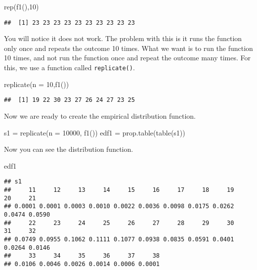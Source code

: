\documentclass[
]{article}
\newenvironment{Shaded}{\begin{snugshade}}{\end{snugshade}}
\newcommand{\AttributeTok}[1]{\textcolor[rgb]{0.77,0.63,0.00}{#1}}
\newcommand{\DecValTok}[1]{\textcolor[rgb]{0.00,0.00,0.81}{#1}}
\newcommand{\FunctionTok}[1]{\textcolor[rgb]{0.00,0.00,0.00}{#1}}
\newcommand{\NormalTok}[1]{#1}
\newcommand{\OtherTok}[1]{\textcolor[rgb]{0.56,0.35,0.01}{#1}}
\begin{document}
\begin{Shaded}
\begin{Highlighting}[]
\FunctionTok{rep}\NormalTok{(}\FunctionTok{f1}\NormalTok{(),}\DecValTok{10}\NormalTok{)}
\end{Highlighting}
\end{Shaded}

\begin{verbatim}
##  [1] 23 23 23 23 23 23 23 23 23 23
\end{verbatim}

You will notice it does not work. The problem with this is it runs the
function only once and repeats the outcome 10 times. What we want is to
run the function 10 times, and not run the function once and repeat the
outcome many times. For this, we use a function called
\texttt{replicate()}.

\begin{Shaded}
\begin{Highlighting}[]
\FunctionTok{replicate}\NormalTok{(}\AttributeTok{n =} \DecValTok{10}\NormalTok{,}\FunctionTok{f1}\NormalTok{())}
\end{Highlighting}
\end{Shaded}

\begin{verbatim}
##  [1] 19 22 30 23 27 26 24 27 23 25
\end{verbatim}

Now we are ready to create the empirical distribution function.

\begin{Shaded}
\begin{Highlighting}[]
\NormalTok{s1 }\OtherTok{=} \FunctionTok{replicate}\NormalTok{(}\AttributeTok{n =} \DecValTok{10000}\NormalTok{, }\FunctionTok{f1}\NormalTok{())}
\NormalTok{edf1 }\OtherTok{=} \FunctionTok{prop.table}\NormalTok{(}\FunctionTok{table}\NormalTok{(s1))}
\end{Highlighting}
\end{Shaded}

Now you can see the distribution function.

\begin{Shaded}
\begin{Highlighting}[]
\NormalTok{edf1}
\end{Highlighting}
\end{Shaded}

\begin{verbatim}
## s1
##     11     12     13     14     15     16     17     18     19     20     21 
## 0.0001 0.0001 0.0003 0.0010 0.0022 0.0036 0.0098 0.0175 0.0262 0.0474 0.0590 
##     22     23     24     25     26     27     28     29     30     31     32 
## 0.0749 0.0955 0.1062 0.1111 0.1077 0.0938 0.0835 0.0591 0.0401 0.0264 0.0146 
##     33     34     35     36     37     38 
## 0.0106 0.0046 0.0026 0.0014 0.0006 0.0001
\end{verbatim}
\end{document}
